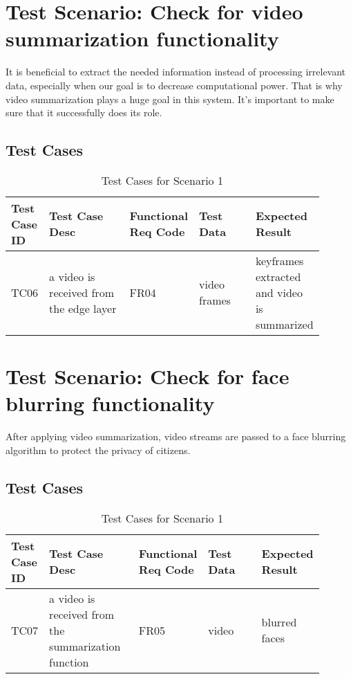 \documentclass[12pt]{article}
\begin{document}
\section{Test Scenario: Check for video summarization functionality}\label{sec:TSy}
It is beneficial to extract the needed information instead of processing irrelevant data, especially when our goal is to decrease computational power. That is why video summarization plays a huge goal in this system. It's important to make sure that it successfully does its role.
\subsection{Test Cases}
\begin{table}[h]
\caption{Test Cases for Scenario 1}
\label{tab:TC1}
\begin{tabular}{|p{0.1\linewidth}|p{0.3\linewidth}|p{0.1\linewidth}|p{0.2\linewidth}|p{0.2\linewidth}|}
\hline
Test Case ID & Test Case Desc & Functional Req Code & Test Data & Expected Result \\ \hline
TC06  & a video is received from the edge layer & FR04 &  video frames   &  keyframes extracted and video is summarized                \\ \hline

\end{tabular}
\end{table}

\newpage
\section{Test Scenario: Check for face blurring functionality}\label{sec:TSy}
After applying video summarization, video streams are passed to a face blurring algorithm to protect the privacy of citizens.
\subsection{Test Cases}
\begin{table}[h]
\caption{Test Cases for Scenario 1}
\label{tab:TC1}
\begin{tabular}{|p{0.1\linewidth}|p{0.3\linewidth}|p{0.1\linewidth}|p{0.2\linewidth}|p{0.2\linewidth}|}
\hline
Test Case ID & Test Case Desc & Functional Req Code & Test Data & Expected Result \\ \hline
TC07  & a video is received from the summarization function & FR05 &  video   &  blurred faces                \\ \hline

\end{tabular}
\end{table}
\end{document}
